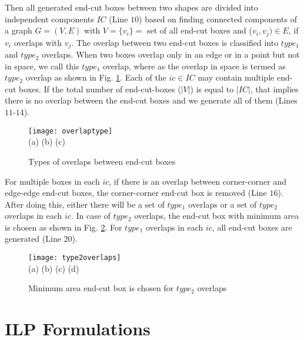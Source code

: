 \documentclass[12pt]{spieman}
\theoremstyle{plain}
\begin{document}
\begin{spacing}{1}
Then all generated end-cut boxes between two shapes are divided into independent components $IC$ (Line $10$) based on finding connected components of a graph $G=(V,E)$ with $V=\{v_{i}\}=$ set of all end-cut boxes and ($v_{i},v_{j}) \in E$, if $v_{i}$ overlaps with $v_{j}$. The overlap between two end-cut boxes is classified into $type_{1}$ and $type_{2}$ overlaps. When two boxes overlap only in an edge or in a point but not in space, we call this $type_{1}$ overlap, where as the overlap in space is termed as $type_{2}$ overlap as shown in Fig. \ref{fig:overlaptype}. Each of the $ic \in IC$ may contain multiple end-cut boxes. If the total number of end-cut-boxes ($|V|$) is equal to $|IC|$, that implies there is no overlap between the end-cut boxes and we generate all of them (Lines $11$-$14$). 

\begin{figure}[htb]
  \centering
  \texttt{[image: overlaptype]}
  \\ \hspace{0.4cm} (a) \hspace{3.8cm} (b) \hspace{3.8cm} (c)
  \caption{Types of overlaps between end-cut boxes}
  \label{fig:overlaptype}
\end{figure}

For multiple boxes in each $ic$, if there is an overlap between corner-corner and edge-edge end-cut boxes, the corner-corner end-cut box is removed (Line $16$).
After doing this, either there will be a set of $type_{1}$ overlaps or a set of $type_{2}$ overlaps in each $ic$.
In case of $type_{2}$ overlaps, the end-cut box with minimum area is chosen as shown in Fig. \ref{fig:type2overlaps}.
For $type_{1}$ overlaps in each $ic$, all end-cut boxes are generated (Line $20$).



\begin{figure}[htb]
  \centering
  \texttt{[image: type2overlaps]} 
  \\ \hspace{1.4cm} (a) \hspace{3.0cm} (b) \hspace{3.0cm} (c) \hspace{3.0cm} (d)
  \caption{Minimum area end-cut box is chosen for $type_{2}$ overlaps}
  \label{fig:type2overlaps}
\end{figure}



\section{ILP Formulations}
\label{sec:tplec_algo}



\end{spacing}
\end{document}
